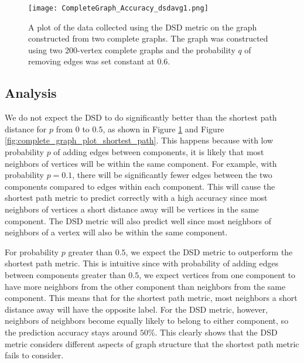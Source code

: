\begin{figure}[h]
\centering
\texttt{[image: CompleteGraph\_Accuracy\_dsdavg1.png]}
\caption{A plot of the data collected using the DSD metric on the graph constructed from two complete graphs. The graph was constructed using two 200-vertex complete graphs and the probability $q$ of removing edges was set constant at $0.6$.}
\label{fig:complete_graph_plot_dsd}
\end{figure}

\subsection{Analysis}
\noindent
We do not expect the DSD to do significantly better than the shortest path distance for $p$ from $0$ to $0.5$, as shown in Figure \ref{fig:complete_graph_plot_dsd} and Figure \ref{fig:complete_graph_plot_shortest_path}. This happens because with low probability $p$ of adding edges between components, it is likely that most neighbors of vertices will be within the same component. For example, with probability $p = 0.1$,  there will be significantly fewer edges between the two components compared to edges within each component. This will cause the shortest path metric to predict correctly with a high accuracy since most neighbors of vertices a short distance away will be vertices in the same component. The DSD metric will also predict well since most neighbors of neighbors of a vertex will also be within the same component.

For probability $p$ greater than $0.5$, we expect the DSD metric to outperform the shortest path metric. This is intuitive since with probability of adding edges between components greater than $0.5$, we expect vertices from one component to have more neighbors from the other component than neighbors from the same component. This means that for the shortest path metric, most neighbors a short distance away will have the opposite label. For the DSD metric, however, neighbors of neighbors become equally likely to belong to either component, so the prediction accuracy stays around $50\%$. This clearly shows that the DSD metric considers different aspects of graph structure that the shortest path metric fails to consider.

